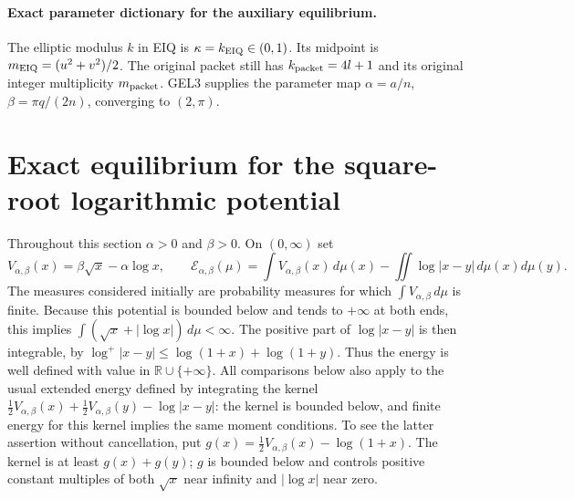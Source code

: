 \documentclass[11pt,a4paper]{article}
\begin{document}

\clearpage
\paragraph{Exact parameter dictionary for the auxiliary equilibrium.}
The elliptic modulus $k$ in EIQ is $\kappa=k_{\rm EIQ}\in(0,1)$.
Its midpoint is $m_{\rm EIQ}=(u^2+v^2)/2$.
The original packet still has $k_{\rm packet}=4l+1$ and its original
integer multiplicity $m_{\rm packet}$. GEL3 supplies the parameter map
$\alpha=a/n$, $\beta=\pi q/(2n)$, converging to $(2,\pi)$.

\section{Exact equilibrium for the square-root logarithmic potential}
\label{sec:independent-sqrt-log-equilibrium}

Throughout this section $\alpha>0$ and $\beta>0$.  On $(0,\infty)$ set
\begin{equation}\tag{EIQ1}
 V_{\alpha,\beta}(x)=\beta\sqrt{x}-\alpha\log x,
 \qquad
 \mathcal E_{\alpha,\beta}(\mu)
 =\int V_{\alpha,\beta}(x)\,d\mu(x)
       -\iint\log|x-y|\,d\mu(x)d\mu(y).
\end{equation}
The measures considered initially are probability measures for which
$\int V_{\alpha,\beta}\,d\mu$ is finite.  Because this potential is bounded
below and tends to $+\infty$ at both ends, this implies
$\int(\sqrt{x}+|\log x|)\,d\mu<\infty$.
The positive part of $\log|x-y|$ is then integrable, by
$\log^+|x-y|\leq\log(1+x)+\log(1+y)$.
Thus the energy is well defined with value in $\mathbb R\cup\{+\infty\}$.
All comparisons below also apply to the usual extended energy defined by
integrating the kernel
$\tfrac12V_{\alpha,\beta}(x)+\tfrac12V_{\alpha,\beta}(y)-\log|x-y|$:
the kernel is bounded below, and finite energy for this kernel implies the
same moment conditions.  To see the latter assertion without cancellation,
put $g(x)=\tfrac12V_{\alpha,\beta}(x)-\log(1+x)$.
The kernel is at least $g(x)+g(y)$; $g$ is bounded below and controls positive
constant multiples of both $\sqrt{x}$ near infinity and $|\log x|$ near zero.
\end{document}
